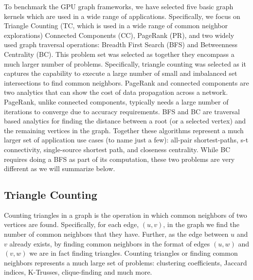 
To benchmark the GPU graph frameworks, we have selected five basic graph kernels which are used in a wide range of applications. Specifically, we focus on Triangle Counting (TC, which is used in a wide range of common neighbor explorations) Connected Components (CC), PageRank (PR), and two widely used graph traversal operations: Breadth First Search (BFS) and Betweenness Centrality (BC). This problem set was selected as together they encompass a much larger number of problems.
Specifically, triangle counting was selected as it captures the capability to execute a large number of small and imbalanced set intersections to find common neighbors. PageRank and connected components are two analytics that can show the cost of data propagation across a network. PageRank, unlike connected components, typically needs a large number of iterations to converge due to accuracy requirements. BFS and BC are traversal based analytics for finding the distance between a root (or a selected vertex) and the remaining vertices in the graph. Together these algorithms represent a much larger set of application use cases (to name just a few): all-pair shortest-paths, s-t connectivity, single-source shortest path, and closeness centrality. While BC requires doing a BFS as part of its computation, these two problems are very different as we will summarize below.



\subsection{Triangle Counting}
Counting triangles in a graph is the operation in which common neighbors of two vertices are found. Specifically, for each edge, $(u,v)$, in the graph we find the number of common neighbors that they have. Further, as the edge between $u$ and $v$ already exists, by finding common neighbors in the format of edges $(u,w)$ and $(v,w)$ we are in fact finding triangles.
Counting triangles or finding common neighbors represents a much large set of problems: clustering coefficients, Jaccard indices, K-Trusses, clique-finding and much more.

